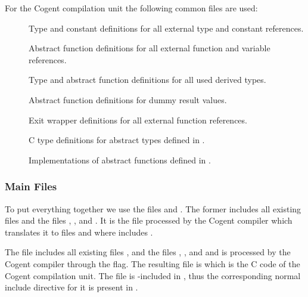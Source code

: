 For the Cogent compilation unit the following common files are used:
\begin{description}
\item[] Type and constant definitions for all external type and constant references.
\item[] Abstract function definitions for all external function and variable references.
\item[] Type and abstract function definitions for all used derived types.
\item[] Abstract function definitions for dummy result values.
\item[] Exit wrapper definitions for all external function references.
\item[] C type definitions for abstract types defined in .
\item[] Implementations of abstract functions defined in .
\end{description}

\subsubsection{Main Files}

To put everything together we use the files  and . The former includes all 
existing  files and the files , , 
 and .
It is the file processed by the Cogent compiler which translates it to files  
and  where  includes . 

The file  includes all existing files 
, and the files , , and  and 
is processed by the Cogent compiler through the 
 flag. The resulting file is  which is the C code of 
the Cogent compilation unit. 
The file  is 
-included in , thus the corresponding normal include directive for it is present in 
.

